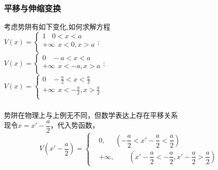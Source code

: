 \begin{frame}
  \frametitle{平移与伸缩变换}
  考虑势阱有如下变化,如何求解方程\\ 
	 {$ \displaystyle 
   V(x)=\left \{ 
   \begin{array}{cccc}
	   1	~~ ~~ 0<x<a \\  
	   +\infty ~~x<0, x>a\\
   \end{array}
   \right.
   ;$} \\ \vspace*{0.3em}
   {$ \displaystyle  V(x)=\left \{ 
	  \begin{array}{cccc}
		  0	~~ ~~ -a<x<a \\  
		  +\infty ~~x<-a, x>a\\
	  \end{array}
	  \right.
  ;$}\\ \vspace*{0.3em}
  {$ \displaystyle   V(x)=\left \{ 
	  \begin{array}{cccc}
		  0	~~ ~~ -\frac{a}{2}<x<\frac{a}{2} \\  
		  +\infty ~~x<-\frac{a}{2}, x>\frac{a}{2}\\
	  \end{array}
	  \right.
   $} \\
\end{frame} 

\begin{frame} 
	\frametitle{}
	\解 势阱在物理上与上例无不同，但数学表达上存在平移关系\\
	现令$x = x'- \dfrac{a}{2}$，代入势函数，
	$$ \displaystyle 
	V(x'- \dfrac{a}{2})=\left\{ 
	\begin{aligned}
		&0, ~~\quad (-\dfrac{a}{2} < x'- \dfrac{a}{2} < \dfrac{a}{2} ) \\  
		&+\infty,~~\quad~~~ (x'- \dfrac{a}{2} < -\dfrac{a}{2} , x'- \dfrac{a}{2} > \dfrac{a}{2})
	\end{aligned}
	\right.$$
\end{frame}

